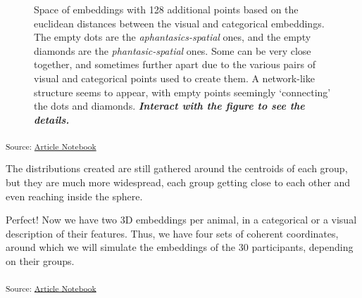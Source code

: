 \documentclass[
  authoryear]{elsarticle}
\begin{document}
\label{cell-fig-intermediate-embeddings}
\begin{figure}[H]


\caption{\label{fig-intermediate-embeddings}Space of embeddings with 128
additional points based on the euclidean distances between the visual
and categorical embeddings. The empty dots are the
\emph{aphantasics-spatial} ones, and the empty diamonds are the
\emph{phantasic-spatial} ones. Some can be very close together, and
sometimes further apart due to the various pairs of visual and
categorical points used to create them. A network-like structure seems
to appear, with empty points seemingly `connecting' the dots and
diamonds. \textbf{\emph{Interact with the figure to see the details.}}}

\end{figure}%

\textsubscript{Source:
\href{https://m-delem.github.io/2499-similarity-manuscript/index.qmd.html}{Article
Notebook}}

The distributions created are still gathered around the centroids of
each group, but they are much more widespread, each group getting close
to each other and even reaching inside the sphere.

Perfect! Now we have two 3D embeddings per animal, in a categorical or a
visual description of their features. Thus, we have four sets of
coherent coordinates, around which we will simulate the embeddings of
the 30 participants, depending on their groups.

\textsubscript{Source:
\href{https://m-delem.github.io/2499-similarity-manuscript/index.qmd.html}{Article
Notebook}}
\end{document}
